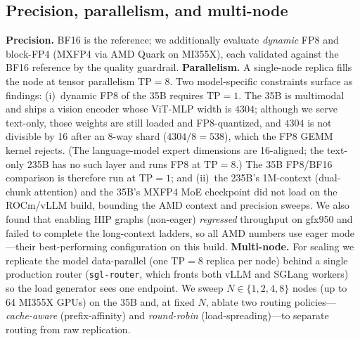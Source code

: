\subsection{Precision, parallelism, and multi-node}
\textbf{Precision.} BF16 is the reference; we additionally evaluate \emph{dynamic}
FP8 and block-FP4 (MXFP4 via AMD Quark on MI355X), each validated against the BF16
reference by the quality guardrail. \textbf{Parallelism.} A single-node replica
fills the node at tensor parallelism $\text{TP}{=}8$. Two model-specific
constraints surface as findings: (i)~dynamic FP8 of the 35B requires
$\text{TP}{=}1$. The 35B is multimodal and ships a vision encoder whose ViT-MLP
width is $4304$; although we serve text-only, those weights are still loaded and
FP8-quantized, and $4304$ is not divisible by 16 after an 8-way shard
($4304/8{=}538$), which the FP8 GEMM kernel rejects. (The language-model expert
dimensions are 16-aligned; the text-only 235B has no such layer and runs FP8 at
$\text{TP}{=}8$.) The 35B FP8/BF16 comparison is therefore run at $\text{TP}{=}1$;
and
(ii)~the 235B's 1M-context (dual-chunk attention) and the 35B's MXFP4 MoE
checkpoint did not load on the ROCm/vLLM build, bounding the AMD context and
precision sweeps. We also found that enabling HIP graphs (non-eager) \emph{regressed}
throughput on gfx950 and failed to complete the long-context ladders, so all AMD
numbers use eager mode---their best-performing configuration on this build.
\textbf{Multi-node.} For scaling we replicate the model data-parallel (one
$\text{TP}{=}8$ replica per node) behind a single production router
(\texttt{sgl-router}, which fronts both vLLM and SGLang workers) so the load
generator sees one endpoint. We sweep $N\in\{1,2,4,8\}$ nodes (up to 64 MI355X
GPUs) on the 35B and, at fixed $N$, ablate two routing policies---\emph{cache-aware}
(prefix-affinity) and \emph{round-robin} (load-spreading)---to separate routing
from raw replication.

